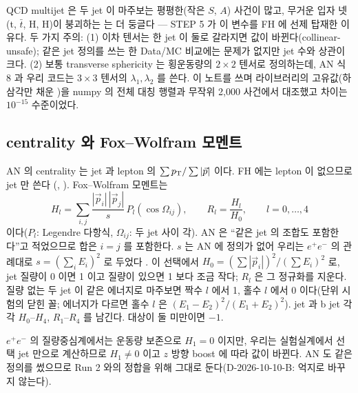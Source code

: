 \begin{note}[읽는 법]
QCD multijet 은 두 jet 이 마주보는 평평한(작은 $S$, $A$) 사건이 많고, 무거운 입자 넷(t, $\bar t$, H, H)이 붕괴하는 \ttHH{} 는 더 둥글다 — STEP 5 가 이
변수를 FH 에 선제 탑재한 이유다. 두 가지 주의: (1) 이차 텐서는 한 jet 이 둘로 갈라지면 값이 바뀐다(collinear-unsafe); 같은 jet
정의를 쓰는 한 Data/MC 비교에는 문제가 없지만 jet 수와 상관이 크다. (2) 보통 transverse sphericity 는 횡운동량의 $2\times2$ 텐서로 정의하는데,
AN 식 8 과 우리 코드는 $3\times3$ 텐서의 $\lambda_1,\lambda_2$ 를 쓴다. 이 노트를 쓰며 라이브러리의 고유값(하삼각만 채운 )을
numpy 의 전체 대칭 행렬과 무작위 2,000 사건에서 대조했고 차이는 $10^{-15}$ 수준이었다.
\end{note}

\subsection{centrality 와 Fox–Wolfram 모멘트}
AN 의 centrality 는 jet 과 lepton 의 $\sum p_{\mathrm{T}}/\sum|\vec p|$ 이다. FH 에는 lepton 이 없으므로 jet 만 쓴다
(, ). Fox–Wolfram 모멘트는
\begin{equation}
H_l=\sum_{i,j}\frac{|\vec p_i|\,|\vec p_j|}{s}\,P_l(\cos\Omega_{ij}),\qquad R_l=\frac{H_l}{H_0},\qquad l=0,\dots,4
\label{eq:reco-fw}
\end{equation}
이다($P_l$: Legendre 다항식, $\Omega_{ij}$: 두 jet 사이 각). AN 은 ``같은 jet 의 조합도 포함한다''고 적었으므로
합은 $i=j$ 를 포함한다. $s$ 는 AN 에 정의가 없어 우리는 $e^+e^-$ 의 관례대로 $s=(\sum_iE_i)^2$ 로 두었다
\tagours{}. 이 선택에서 $H_0=(\sum|\vec p_i|)^2/(\sum E_i)^2$ 로, jet 질량이 0 이면 1 이고 질량이 있으면 1 보다 조금 작다;
$R_l$ 은 그 정규화를 지운다. 질량 없는 두 jet 이 같은 에너지로 마주보면 짝수 $l$ 에서 1, 홀수 $l$ 에서 0 이다(단위 시험의 닫힌 꼴; 에너지가
다르면 홀수 $l$ 은 $(E_1-E_2)^2/(E_1+E_2)^2$). jet 과 b jet 각각
$H_0$–$H_4$, $R_1$–$R_4$ 를 남긴다. 대상이 둘 미만이면 $-1$.

\begin{note}
$e^+e^-$ 의 질량중심계에서는 운동량 보존으로 $H_1=0$ 이지만, 우리는 실험실계에서 선택 jet 만으로 계산하므로 $H_1\ne0$ 이고 $z$ 방향 boost 에 따라
값이 바뀐다. AN 도 같은 정의를 썼으므로 Run 2 와의 정합을 위해 그대로 둔다(D-2026-10-10-B: 억지로 바꾸지 않는다).
\end{note}

